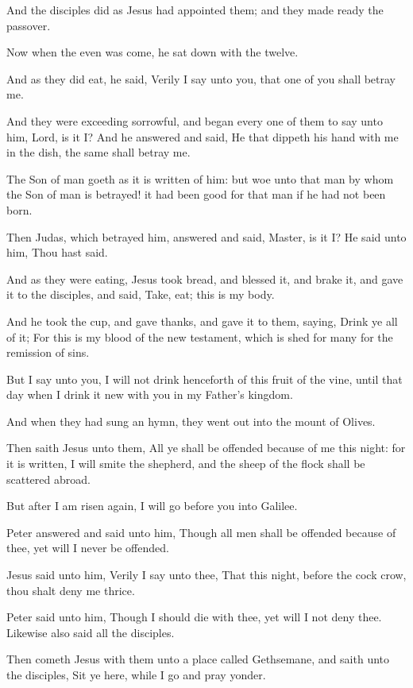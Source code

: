 \verse And the disciples did as Jesus had appointed them; and they made ready the passover.

\verse Now when the even was come, he sat down with the twelve.

\verse And as they did eat, he said, Verily I say unto you, that one of you shall betray me.

\verse And they were exceeding sorrowful, and began every one of them to say unto him, Lord, is it I?  \verse And he answered and said, He that dippeth his hand with me in the dish, the same shall betray me.

\verse The Son of man goeth as it is written of him: but woe unto that man by whom the Son of man is betrayed! it had been good for that man if he had not been born.

\verse Then Judas, which betrayed him, answered and said, Master, is it I?  He said unto him, Thou hast said.

\verse And as they were eating, Jesus took bread, and blessed it, and brake it, and gave it to the disciples, and said, Take, eat; this is my body.

\verse And he took the cup, and gave thanks, and gave it to them, saying, Drink ye all of it; \verse For this is my blood of the new testament, which is shed for many for the remission of sins.

\verse But I say unto you, I will not drink henceforth of this fruit of the vine, until that day when I drink it new with you in my Father's kingdom.

\verse And when they had sung an hymn, they went out into the mount of Olives.

\verse Then saith Jesus unto them, All ye shall be offended because of me this night: for it is written, I will smite the shepherd, and the sheep of the flock shall be scattered abroad.

\verse But after I am risen again, I will go before you into Galilee.

\verse Peter answered and said unto him, Though all men shall be offended because of thee, yet will I never be offended.

\verse Jesus said unto him, Verily I say unto thee, That this night, before the cock crow, thou shalt deny me thrice.

\verse Peter said unto him, Though I should die with thee, yet will I not deny thee. Likewise also said all the disciples.

\verse Then cometh Jesus with them unto a place called Gethsemane, and saith unto the disciples, Sit ye here, while I go and pray yonder.

